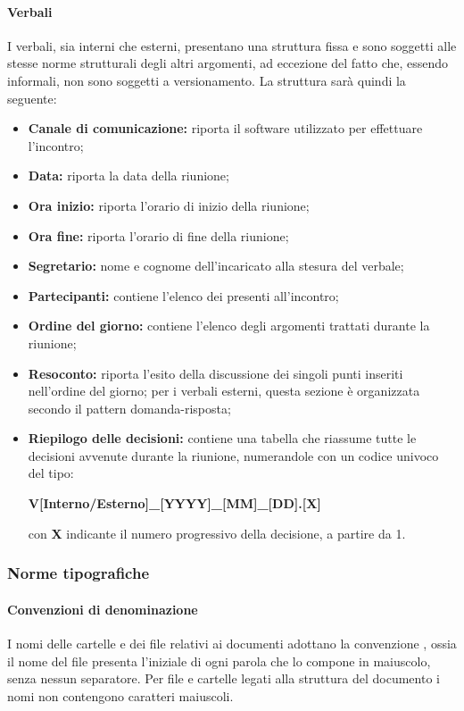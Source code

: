 \paragraph{Verbali}      
I verbali, sia interni che esterni, presentano una struttura fissa e sono soggetti alle stesse norme strutturali degli altri argomenti, ad eccezione del fatto che, essendo informali, non sono soggetti a versionamento.
La struttura sarà quindi la seguente:
\begin{itemize}
	\item \textbf{Canale di comunicazione:} riporta il software utilizzato per effettuare l'incontro;
	\item \textbf{Data:} riporta la data della riunione;
	\item \textbf{Ora inizio:} riporta l'orario di inizio della riunione;
	\item \textbf{Ora fine:} riporta l'orario di fine della riunione;
	\item \textbf{Segretario:} nome e cognome dell'incaricato alla stesura del verbale;
	\item \textbf{Partecipanti:} contiene l'elenco dei presenti all'incontro;   
	\item \textbf{Ordine del giorno:} contiene l'elenco degli argomenti trattati durante la riunione;
	\item \textbf{Resoconto:} riporta l'esito della discussione dei singoli punti inseriti nell'ordine del giorno; per i verbali esterni, questa sezione è organizzata secondo il pattern domanda-risposta;
	\item \textbf{Riepilogo delle decisioni:} contiene una tabella che riassume tutte le decisioni avvenute durante la riunione, numerandole con un codice univoco del tipo: \newline 
	\centerline{\textbf{V[Interno/Esterno]\_[YYYY]\_[MM]\_[DD].[X]}}\newline con \textbf{X} indicante il numero progressivo della decisione, a partire da 1.
\end{itemize}
\subsubsection{Norme tipografiche}
\paragraph{Convenzioni di denominazione}   
I nomi delle cartelle e dei file relativi ai documenti adottano la convenzione , ossia il nome del file presenta l'iniziale di ogni parola che lo compone in maiuscolo, senza nessun separatore. Per file e cartelle legati alla struttura del documento i nomi non contengono caratteri maiuscoli.
